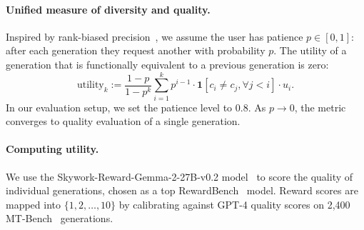 \paragraph{Unified measure of diversity and quality.}
Inspired by rank-biased precision~\cite{moffat2008}, we assume the user has patience $p \in [0,1]$: after each generation they request another with probability $p$.
The utility of a generation that is functionally equivalent to a previous generation is zero:
\begin{equation}
\mathrm{utility}_k := \frac{1-p}{1-p^k} \sum_{i=1}^{k} p^{i-1} \cdot \mathbf{1}[c_i \neq c_j, \forall j < i] \cdot u_i.
\end{equation}
In our evaluation setup, we set the patience level to $0.8$.
As $p \to 0$, the metric converges to quality evaluation of a single generation.

\paragraph{Computing utility.}
We use the Skywork-Reward-Gemma-2-27B-v0.2 model~\cite{liu2024skywork} to score the quality of individual generations, chosen as a top RewardBench~\cite{lambert2024} model.
Reward scores are mapped into $\{1,2,\ldots,10\}$ by calibrating against GPT-4 quality scores on 2,400 MT-Bench~\cite{zheng2023mtbench} generations.

